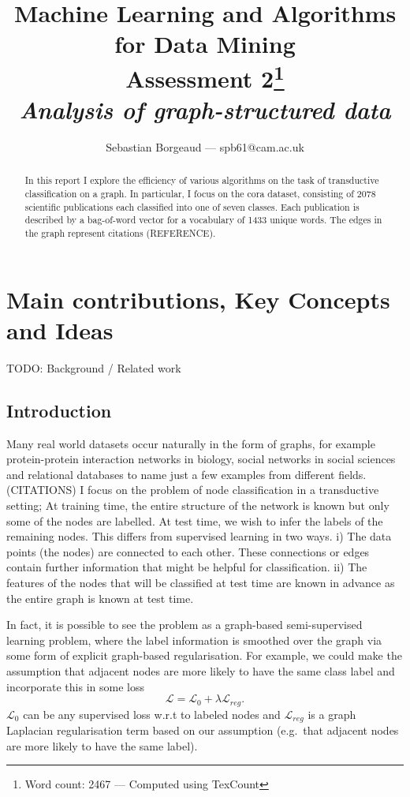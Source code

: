 \documentclass[12pt]{article}
\title{{\small{Machine Learning and Algorithms for Data Mining} \\
Assessment 2\footnote{Word count: 2467 --- Computed using TexCount}} \\
\textit{Analysis of graph-structured data}}
\author{Sebastian Borgeaud --- spb61@cam.ac.uk}
\theoremstyle{definition}
\begin{document}
\maketitle

\begin{abstract}
	In this report I explore the efficiency of various algorithms on the task of transductive classification on a graph. In particular, I focus on the cora dataset, consisting of 2078 scientific publications each classified into one of seven classes. Each publication is described by a bag-of-word vector for a vocabulary of 1433 unique words. The edges in the graph represent citations (REFERENCE).
	\end{abstract}

\section{Main contributions, Key Concepts and Ideas}

TODO: Background / Related work

\subsection{Introduction}
Many real world datasets occur naturally in the form of graphs, for example protein-protein interaction networks in biology, social networks in social sciences and relational databases to name just a few examples from different fields. (CITATIONS) I focus on the problem of node classification in a transductive setting; At training time, the entire structure of the network is known but only some of the nodes are labelled. At test time, we wish to infer the labels of the remaining nodes. This differs from supervised learning in two ways. i) The data points (the nodes) are connected to each other. These connections or edges contain further information that might be helpful for classification. ii) The features of the nodes that will be classified at test time are known in advance as the entire graph is known at test time. 

\bigskip

In fact, it is possible to see the problem as a graph-based semi-supervised learning problem, where the label information is smoothed over the graph via some form of explicit graph-based regularisation. For example, we could make the assumption that adjacent nodes are more likely to have the same class label and incorporate this in some loss
\begin{equation}
	\mathcal{L} = \mathcal{L}_0 + \lambda \mathcal{L}_{\mathit{reg}}.
\end{equation}
$\mathcal{L}_0$ can be any supervised loss w.r.t to labeled nodes and $\mathcal{L}_{\mathit{reg}}$ is a graph Laplacian regularisation term based on our assumption (e.g.\ that adjacent nodes are more likely to have the same label).
\end{document}
